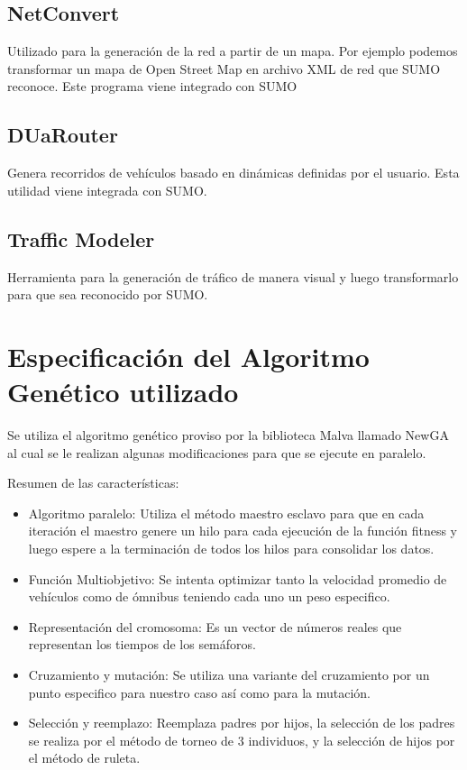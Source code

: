 \subsection{NetConvert}
Utilizado para la generación de la red a partir de un mapa. Por ejemplo podemos transformar un mapa de Open Street Map en archivo XML de red que SUMO reconoce. Este programa viene integrado con SUMO

\subsection{DUaRouter}
Genera recorridos de vehículos basado en dinámicas definidas por el usuario. Esta utilidad viene integrada con SUMO.

\subsection{Traffic Modeler}
Herramienta para la generación de tráfico de manera visual y luego transformarlo para que sea reconocido por SUMO. \citep{TrafficModeler}

\newpage

\section{Especificación del Algoritmo Genético utilizado}
Se utiliza el algoritmo genético proviso por la biblioteca  Malva  llamado NewGA al cual se le realizan algunas modificaciones para que se ejecute en paralelo.


Resumen de las características:
\begin{itemize}

\item Algoritmo paralelo: Utiliza el método maestro esclavo para que en cada iteración el maestro genere un hilo para cada ejecución  de la función fitness y luego espere a la terminación de todos los hilos para consolidar los datos. 
\item Función Multiobjetivo: Se intenta optimizar tanto la velocidad promedio de vehículos como de ómnibus teniendo cada uno un peso especifico.
\item Representación del cromosoma: Es un vector de números reales que representan los tiempos de los semáforos.
\item Cruzamiento y mutación: Se utiliza una variante del cruzamiento por un punto especifico para nuestro caso así como para la mutación.
\item Selección y reemplazo: Reemplaza padres por hijos, la selección de los padres se realiza por el método de torneo de 3 individuos, y la selección de hijos por el método de ruleta.

\end{itemize}

